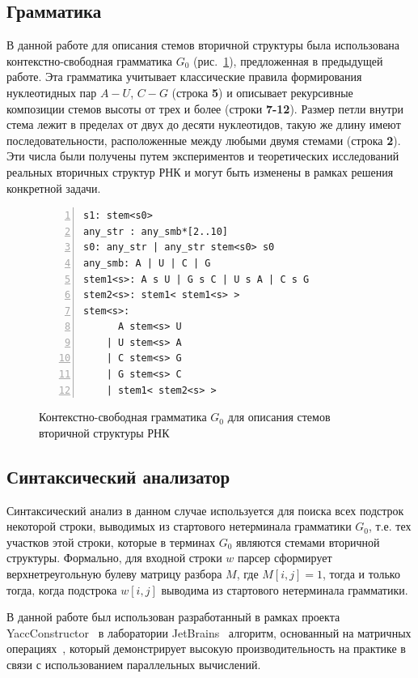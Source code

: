 \documentclass[14pt]{matmex-diploma-custom}
\begin{document}
\subsection{Грамматика}
В данной работе для описания стемов вторичной структуры была использована контекстно-свободная грамматика $G_0$ (рис.~\ref{gram}), предложенная в предыдущей работе. Эта грамматика учитывает классические правила формирования нуклеотидных пар $A-U$, $C-G$ (строка \textbf{5}) и описывает рекурсивные композиции стемов высоты от трех и более (строки \textbf{7-12}). Размер петли внутри стема лежит в пределах от двух до десяти нуклеотидов, такую же длину имеют последовательности, расположенные между любыми двумя стемами (строка \textbf{2}). Эти числа были получены путем экспериментов и теоретических исследований реальных вторичных структур РНК и могут быть изменены в рамках решения конкретной задачи.

\begin{figure}[h]
\begin{Verbatim}[numbers=left,xleftmargin=5mm]
s1: stem<s0>
any_str : any_smb*[2..10]
s0: any_str | any_str stem<s0> s0
any_smb: A | U | C | G
stem1<s>: A s U | G s C | U s A | C s G 
stem2<s>: stem1< stem1<s> >
stem<s>:  
      A stem<s> U 
    | U stem<s> A 
    | C stem<s> G 
    | G stem<s> C 
    | stem1< stem2<s> >  
\end{Verbatim}
\caption{Контекстно-свободная грамматика $G_0$ для описания стемов вторичной структуры РНК}
\label{gram}
\end{figure}

\subsection{Синтаксический анализатор}
Синтаксический анализ в данном случае используется для поиска всех подстрок некоторой строки, выводимых из стартового нетерминала грамматики $G_0$, т.е. тех участков этой строки, которые в терминах $G_0$ являются стемами вторичной структуры. Формально, для входной строки $w$ парсер сформирует верхнетреугольную булеву матрицу разбора $M$, где $M[i,j]=1$, тогда и только тогда, когда подстрока $w[i,j]$  выводима из стартового нетерминала грамматики. 

В данной работе был использован разработанный в рамках проекта YaccConstructor~\cite{yacc} в лаборатории JetBrains~\cite{jetbrains} алгоритм, основанный на матричных операциях~\cite{Azimov:2018:CPQ:3210259.3210264}, который демонстрирует высокую производительность на практике в связи с использованием параллельных вычислений.
\end{document}
